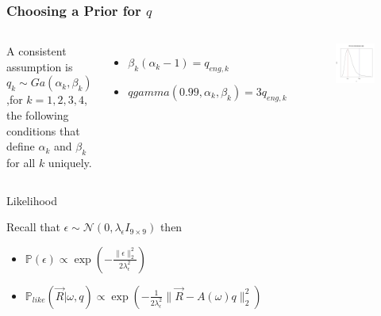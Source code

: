 \documentclass[11pt]{beamer}
\theoremstyle{plain}
\theoremstyle{definition}
\newcommand{\p}{\mathbb{P}}
\newcommand{\like}{\p_{like}}
\begin{document}
\begin{frame}
\frametitle{Choosing a Prior for $q$}
\begin{columns}[c]
\column{2.2in}
A consistent assumption is $q_{k}\sim Ga(\alpha_{k},\beta_{k})$,for $k=1,2,3,4$,
the following conditions that define $\alpha_{k}$ and $\beta_{k}$ for all $k$ uniquely.

\begin{itemize}
\item $\beta_{k}(\alpha_{k}-1)=q_{eng,k}$
\item $qgamma(0.99,\alpha_{k},\beta_{k})=3q_{eng,k}$
\end{itemize}
\column{1.5in}
\begin{figure}
\includegraphics[scale=0.3]{gamma_generic}
\end{figure}
\end{columns}
\end{frame}


\begin{frame}{Likelihood}


Recall that $\epsilon\sim\mathcal{N}(0,\lambda_{\epsilon}I_{9\times 9})$ then

\begin{itemize}
\item $\p(\epsilon)\propto\exp\left(-\frac{\|\epsilon\|_{2}^{2}}{2\lambda_{\epsilon}^{2}}\right)$
\item $\like(\vec{R}|\omega,q)\propto
\exp\left(-\frac{1}{2\lambda_{\epsilon}^{2}}\|\vec{R}-A(\omega)q\|^{2}_{2}\right)$
\end{itemize}
\end{frame}
\end{document}
